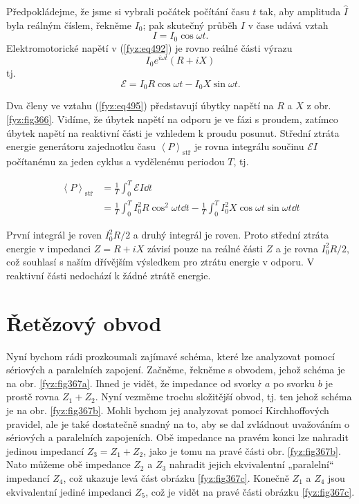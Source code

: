 {  Předpokládejme, že jsme si vybrali počátek počítání času \(t\) tak, aby amplituda \(\hat{I}\) 
  byla reálným číslem, řekněme \(I_0\); pak skutečný průběh \(I\) v čase udává vztah
  \begin{equation}\label{fyz:eq494}
  I = I_0\cos\omega t.
  \end{equation}
  Elektromotorické napětí v (\ref{fyz:eq492}) je rovno reálné části výrazu
  \begin{equation*}
    I_0e^{i\omega t}(R + iX)
  \end{equation*}
  tj.
  \begin{equation}\label{fyz:eq495}
    \mathscr{E} = I_0R\cos\omega t - I_0X\sin\omega t.
  \end{equation}
  
  Dva členy ve vztahu (\ref{fyz:eq495}) představují úbytky napětí na \(R\) a \(X\) z obr. 
  \ref{fyz:fig366}. Vidíme, že úbytek napětí na odporu je ve fázi s proudem, zatímco úbytek napětí 
  na reaktivní části je vzhledem k proudu posunut. Střední ztráta energie generátoru zajednotku 
  času \(\left\langle P\right\rangle_{\text{stř}}\) je rovna integrálu součinu \(\mathscr{E}I\) 
  počítanému za jeden cyklus a vydělenému periodou \(T\), tj.
  
  \begin{align*}
    \left\langle P\right\rangle_{\text{stř}} 
      &= \frac{1}{T}\int_0^T\mathscr{E}I\dd{t}             \\
      &= \frac{1}{T}\int_0^TI_0^2R\cos^2\omega t\dd{t}     
       - \frac{1}{T}\int_0^TI_0^2X\cos\omega t\sin\omega t\dd{t}
  \end{align*}
  
  První integrál je roven \(I_0^2R/2\) a druhý integrál je roven. Proto střední ztráta energie 
  v impedanci \(Z= R+iX\) závisí pouze na reálné části \(Z\) a je rovna \(I_0^2R/2\), což souhlasí 
  s naším dřívějším výsledkem pro ztrátu energie v odporu. V reaktivní části nedochází k žádné 
  ztrátě energie.
  
\section{Řetězový obvod}\label{fyz:IIchapXXIIsecVI}
  Nyní bychom rádi prozkoumali zajímavé schéma, které lze analyzovat pomocí sériových a paralelních 
  zapojení. Začněme, řekněme s obvodem, jehož schéma je na obr. \ref{fyz:fig367a}. Ihned je vidět, 
  že impedance od svorky \(a\) po svorku \(b\) je prostě rovna \(Z_1 + Z_2\). Nyní vezměme trochu 
  složitější obvod, tj. ten jehož schéma je na obr. \ref{fyz:fig367b}. Mohli bychom jej analyzovat 
  pomocí Kirchhoffových pravidel, ale je také dostatečně snadný na to, aby se dal zvládnout 
  uvažováním o sériových a paralelních zapojeních. Obě impedance na pravém konci lze nahradit 
  jedinou impedancí \(Z_3 = Z_1 + Z_2\), jako je tomu na pravé části obr. \ref{fyz:fig367b}. Nato 
  můžeme obě impedance \(Z_2\) a \(Z_3\) nahradit jejich ekvivalentní „paralelní“ impedancí 
  \(Z_4\), což ukazuje levá část obrázku \ref{fyz:fig367c}. Konečně \(Z_1\) a \(Z_4\) jsou 
  ekvivalentní jediné impedanci \(Z_5\), což je vidět na pravé části obrázku \ref{fyz:fig367c}.

}
